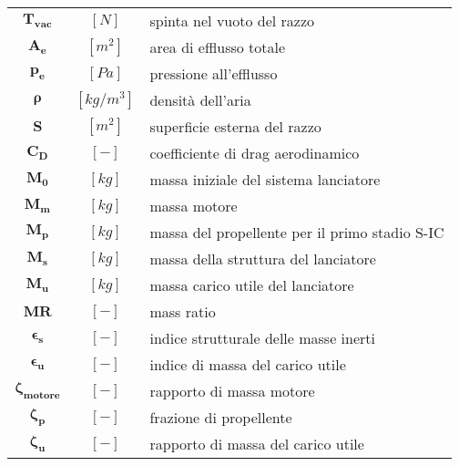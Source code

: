 \begin{multicols}{2}
{\begin{xltabular}{\linewidth}{cc>{\raggedright\arraybackslash}X}
		$\bm{T_{vac}}$ & $[N]$ & spinta nel vuoto del razzo \\
		$\bm{A_e}$ & $[m^2]$ & area di efflusso totale \\
		$\bm{p_e}$ & $[Pa]$ & pressione all'efflusso \\
		$\bm{\rho}$ & $[kg/m^3]$ & densità dell'aria \\
		$\bm{S}$ & $[m^2]$ & superficie esterna del razzo \\
		$\bm{C_D}$ & $[-]$ & coefficiente di drag aerodinamico \\
        $\bm{M_0}$ & $[kg]$ & massa iniziale del sistema lanciatore \\
		$\bm{M_m}$ & $[kg]$ & massa motore \\
		$\bm{M_p}$ & $[kg]$ & massa del propellente per il primo stadio S-IC \\
        $\bm{M_s}$ & $[kg]$ & massa della struttura del lanciatore \\
		$\bm{M_u}$ & $[kg]$ & massa carico utile del lanciatore \\
        $\bm{MR}$ & $[-]$ & mass ratio \\
		$\bm{\epsilon_s}$ & $[-]$ & indice strutturale delle masse inerti \\
        $\bm{\epsilon_u}$ & $[-]$ & indice di massa del carico utile \\
		$\bm{\zeta_{motore}}$ & $[-]$ & rapporto di massa motore \\
        $\bm{\zeta_p}$ & $[-]$ & frazione di propellente \\
		$\bm{\zeta_u}$ & $[-]$ & rapporto di massa del carico utile
	\end{xltabular}
	\unskip
	\unpenalty
	\unpenalty}
	\unvbox\ltmcbox


\end{multicols}
